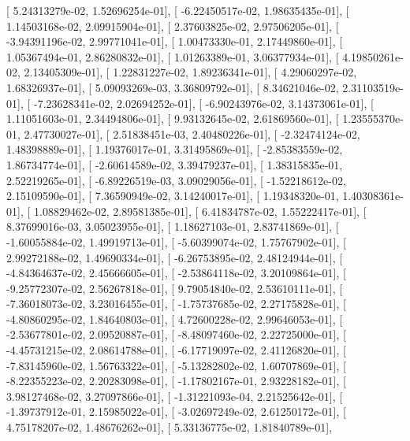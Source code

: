 \documentclass{article}
\begin{document}
       [  5.24313279e-02,   1.52696254e-01],
       [ -6.22450517e-02,   1.98635435e-01],
       [  1.14503168e-02,   2.09915904e-01],
       [  2.37603825e-02,   2.97506205e-01],
       [ -3.94391196e-02,   2.99771041e-01],
       [  1.00473330e-01,   2.17449860e-01],
       [  1.05367494e-01,   2.86280832e-01],
       [  1.01263389e-01,   3.06377934e-01],
       [  4.19850261e-02,   2.13405309e-01],
       [  1.22831227e-02,   1.89236341e-01],
       [  4.29060297e-02,   1.68326937e-01],
       [  5.09093269e-03,   3.36809792e-01],
       [  8.34621046e-02,   2.31103519e-01],
       [ -7.23628341e-02,   2.02694252e-01],
       [ -6.90243976e-02,   3.14373061e-01],
       [  1.11051603e-01,   2.34494806e-01],
       [  9.93132645e-02,   2.61869560e-01],
       [  1.23555370e-01,   2.47730027e-01],
       [  2.51838451e-03,   2.40480226e-01],
       [ -2.32474124e-02,   1.48398889e-01],
       [  1.19376017e-01,   3.31495869e-01],
       [ -2.85383559e-02,   1.86734774e-01],
       [ -2.60614589e-02,   3.39479237e-01],
       [  1.38315835e-01,   2.52219265e-01],
       [ -6.89226519e-03,   3.09029056e-01],
       [ -1.52218612e-02,   2.15109590e-01],
       [  7.36590949e-02,   3.14240017e-01],
       [  1.19348320e-01,   1.40308361e-01],
       [  1.08829462e-02,   2.89581385e-01],
       [  6.41834787e-02,   1.55222417e-01],
       [  8.37699016e-03,   3.05023955e-01],
       [  1.18627103e-01,   2.83741869e-01],
       [ -1.60055884e-02,   1.49919713e-01],
       [ -5.60399074e-02,   1.75767902e-01],
       [  2.99272188e-02,   1.49690334e-01],
       [ -6.26753895e-02,   2.48124944e-01],
       [ -4.84364637e-02,   2.45666605e-01],
       [ -2.53864118e-02,   3.20109864e-01],
       [ -9.25772307e-02,   2.56267818e-01],
       [  9.79054840e-02,   2.53610111e-01],
       [ -7.36018073e-02,   3.23016455e-01],
       [ -1.75737685e-02,   2.27175828e-01],
       [ -4.80860295e-02,   1.84640803e-01],
       [  4.72600228e-02,   2.99646053e-01],
       [ -2.53677801e-02,   2.09520887e-01],
       [ -8.48097460e-02,   2.22725000e-01],
       [ -4.45731215e-02,   2.08614788e-01],
       [ -6.17719097e-02,   2.41126820e-01],
       [ -7.83145960e-02,   1.56763322e-01],
       [ -5.13282802e-02,   1.60707869e-01],
       [ -8.22355223e-02,   2.20283098e-01],
       [ -1.17802167e-01,   2.93228182e-01],
       [  3.98127468e-02,   3.27097866e-01],
       [ -1.31221093e-04,   2.21525642e-01],
       [ -1.39737912e-01,   2.15985022e-01],
       [ -3.02697249e-02,   2.61250172e-01],
       [  4.75178207e-02,   1.48676262e-01],
       [  5.33136775e-02,   1.81840789e-01],
\end{document}
